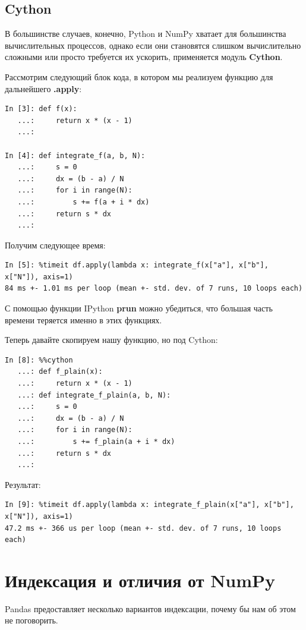 \documentclass{article}
\begin{document}
\subsection*{Cython}
В большинстве случаев, конечно, Python и NumPy хватает для большинства вычислительных процессов, однако если они становятся слишком вычислительно сложными или просто требуется их ускорить, применяется модуль \textbf{Cython}.


Рассмотрим следующий блок кода, в котором мы реализуем функцию для дальнейшего \textbf{.apply}:
\begin{verbatim}
In [3]: def f(x):
   ...:     return x * (x - 1)
   ...: 

In [4]: def integrate_f(a, b, N):
   ...:     s = 0
   ...:     dx = (b - a) / N
   ...:     for i in range(N):
   ...:         s += f(a + i * dx)
   ...:     return s * dx
   ...: 
\end{verbatim}

Получим следующее время:
\begin{verbatim}
In [5]: %timeit df.apply(lambda x: integrate_f(x["a"], x["b"], x["N"]), axis=1)
84 ms +- 1.01 ms per loop (mean +- std. dev. of 7 runs, 10 loops each)
\end{verbatim}
С помощью функции IPython \textbf{prun} можно убедиться, что большая часть времени теряется именно в этих функциях.

Теперь давайте скопируем нашу функцию, но под Cython:
\begin{verbatim}
In [8]: %%cython
   ...: def f_plain(x):
   ...:     return x * (x - 1)
   ...: def integrate_f_plain(a, b, N):
   ...:     s = 0
   ...:     dx = (b - a) / N
   ...:     for i in range(N):
   ...:         s += f_plain(a + i * dx)
   ...:     return s * dx
   ...: 
\end{verbatim}

Результат:
\begin{verbatim}
In [9]: %timeit df.apply(lambda x: integrate_f_plain(x["a"], x["b"], x["N"]), axis=1)
47.2 ms +- 366 us per loop (mean +- std. dev. of 7 runs, 10 loops each)
\end{verbatim}

\section*{Индексация и отличия от NumPy}
Pandas предоставляет несколько вариантов индексации, почему бы нам об этом не поговорить.
\end{document}
